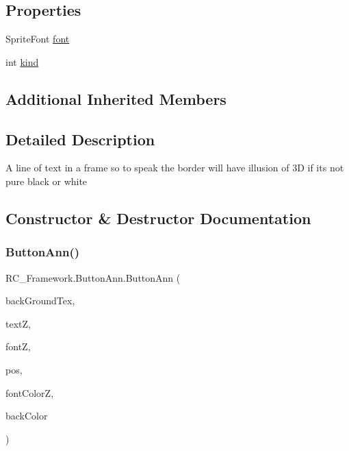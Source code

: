 \subsection*{Properties}
\begin{DoxyCompactItemize}
\item 
Sprite\+Font \mbox{\hyperlink{class_r_c___framework_1_1_button_ann_a2773c8d871d7d9eedb544cf1ad663f05}{font}}
\item 
int \mbox{\hyperlink{class_r_c___framework_1_1_button_ann_aba404164b4906b9e067c7fb8a8188e4a}{kind}}
\end{DoxyCompactItemize}
\subsection*{Additional Inherited Members}


\subsection{Detailed Description}
A line of text in a frame so to speak the border will have illusion of 3D if its not pure black or white 



\subsection{Constructor \& Destructor Documentation}
\mbox{\label{class_r_c___framework_1_1_button_ann_a8110236e18489fa16c2a760b0700aad4}} 
\subsubsection{\texorpdfstring{Button\+Ann()}{ButtonAnn()}}
{\footnotesize\ttfamily R\+C\+\_\+\+Framework.\+Button\+Ann.\+Button\+Ann (\begin{DoxyParamCaption}\item[{Texture2D}]{back\+Ground\+Tex,  }\item[{string}]{textZ,  }\item[{Sprite\+Font}]{fontZ,  }\item[{Vector2}]{pos,  }\item[{Color}]{font\+ColorZ,  }\item[{Color}]{back\+Color }\end{DoxyParamCaption})}



